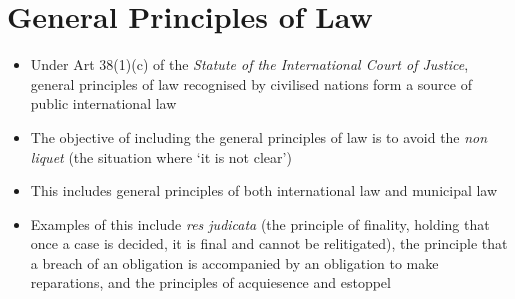 \section{General Principles of Law}
\begin{itemize}
    \item Under Art 38(1)(c) of the \textit{Statute of the International Court of Justice}, general principles of law recognised by civilised nations form a source of public international law
    \item The objective of including the general principles of law is to avoid the \textit{non liquet} (the situation where `it is not clear')
    \item This includes general principles of both international law and municipal law
    \item Examples of this include \textit{res judicata} (the principle of finality, holding that once a case is decided, it is final and cannot be relitigated), the principle that a breach of an obligation is accompanied by an obligation to make reparations, and the principles of acquiesence and estoppel
\end{itemize}

